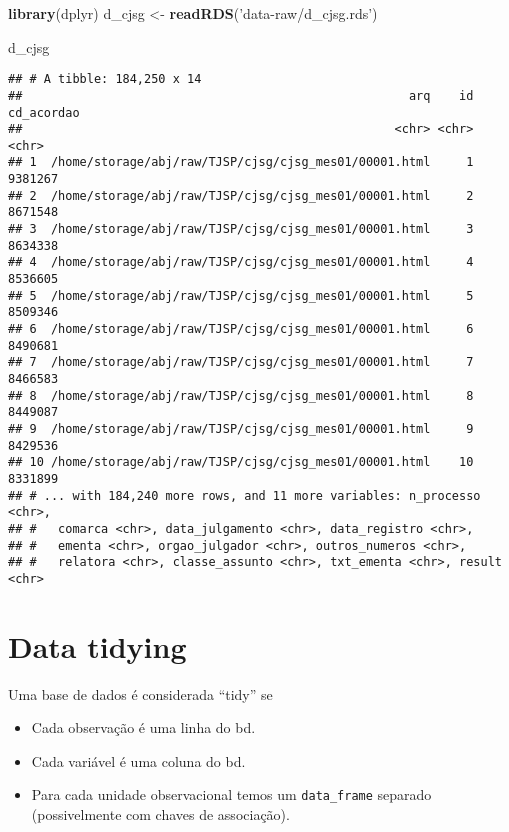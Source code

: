 \documentclass[]{book}
\newenvironment{Shaded}{\begin{snugshade}}{\end{snugshade}}
\newcommand{\KeywordTok}[1]{\textcolor[rgb]{0.13,0.29,0.53}{\textbf{{#1}}}}
\newcommand{\StringTok}[1]{\textcolor[rgb]{0.31,0.60,0.02}{{#1}}}
\newcommand{\NormalTok}[1]{{#1}}
\providecommand{\tightlist}{%
  \setlength{\itemsep}{0pt}\setlength{\parskip}{0pt}}
\begin{document}
\begin{Shaded}
\begin{Highlighting}[]
\KeywordTok{library}\NormalTok{(dplyr)}
\NormalTok{d_cjsg <-}\StringTok{ }\KeywordTok{readRDS}\NormalTok{(}\StringTok{'data-raw/d_cjsg.rds'}\NormalTok{)}

\NormalTok{d_cjsg}
\end{Highlighting}
\end{Shaded}

\begin{verbatim}
## # A tibble: 184,250 x 14
##                                                      arq    id cd_acordao
##                                                    <chr> <chr>      <chr>
## 1  /home/storage/abj/raw/TJSP/cjsg/cjsg_mes01/00001.html     1    9381267
## 2  /home/storage/abj/raw/TJSP/cjsg/cjsg_mes01/00001.html     2    8671548
## 3  /home/storage/abj/raw/TJSP/cjsg/cjsg_mes01/00001.html     3    8634338
## 4  /home/storage/abj/raw/TJSP/cjsg/cjsg_mes01/00001.html     4    8536605
## 5  /home/storage/abj/raw/TJSP/cjsg/cjsg_mes01/00001.html     5    8509346
## 6  /home/storage/abj/raw/TJSP/cjsg/cjsg_mes01/00001.html     6    8490681
## 7  /home/storage/abj/raw/TJSP/cjsg/cjsg_mes01/00001.html     7    8466583
## 8  /home/storage/abj/raw/TJSP/cjsg/cjsg_mes01/00001.html     8    8449087
## 9  /home/storage/abj/raw/TJSP/cjsg/cjsg_mes01/00001.html     9    8429536
## 10 /home/storage/abj/raw/TJSP/cjsg/cjsg_mes01/00001.html    10    8331899
## # ... with 184,240 more rows, and 11 more variables: n_processo <chr>,
## #   comarca <chr>, data_julgamento <chr>, data_registro <chr>,
## #   ementa <chr>, orgao_julgador <chr>, outros_numeros <chr>,
## #   relatora <chr>, classe_assunto <chr>, txt_ementa <chr>, result <chr>
\end{verbatim}

\section{Data tidying}\label{data-tidying}

Uma base de dados é considerada ``tidy'' se

\begin{itemize}
\tightlist
\item
  Cada observação é uma linha do bd.
\item
  Cada variável é uma coluna do bd.
\item
  Para cada unidade observacional temos um \texttt{data\_frame} separado
  (possivelmente com chaves de associação).
\end{itemize}
\end{document}
